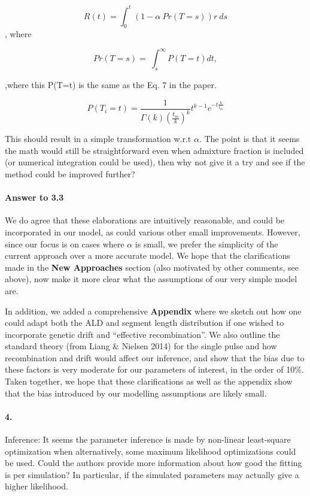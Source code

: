 \documentclass[11pt]{article}
\let\oldparagraph\paragraph
\renewcommand{\paragraph}[1]{\oldparagraph{#1}\mbox{}}
\begin{document}
$$R(t) = \int_{0}^{t}{\left(1-\alpha\ Pr(T=s)\right)r\ ds}$$,
 where 

$$Pr\left(T=s\right)=\ \int_{s}^{\infty}P\left(T=t\right)dt,$$

,where this P(T=t) is the same as the Eq. 7 in the paper.
 
$$  P(T_i=t)=\frac{1}{\Gamma(k)(\frac{t_m}{k})^k}t^{k-1}e^{-t\frac{k}{t_m}}$$
 
This should result in a simple transformation w.r.t $\alpha$. The point is that it seems the math would still be straightforward even when admixture fraction is included (or numerical integration could be used), then why not give it a try and see if the method could be improved further?

\paragraph{Answer to 3.3}
We do agree that these elaborations are intuitively reasonable, and could be incorporated in our model, as could various other small improvements. However, since our focus is on cases where $\alpha$ is small, we prefer the simplicity of the current approach over a more accurate model. We hope that the clarifications made in the \textbf{New Approaches} section (also motivated by other comments, see above), now make it more clear what the assumptions of our very simple model are.

In addition, we added a comprehensive \textbf{Appendix} where we sketch out how one could adapt both the ALD and segment length distribution if one wished to incorporate genetic drift and ``effective recombination''. We also outline the standard theory (from Liang \& Nielsen 2014) for the single pulse and how recombination and drift would affect our inference, and show that the bias due to these factors is very moderate for our parameters of interest, in the order of 10\%. Taken together, we hope that these clarifications as well as the appendix show that the bias introduced by our modelling assumptions are likely small.

\paragraph{4.}
Inference: It seems the parameter inference is made by non-linear least-square optimization when alternatively, some maximum likelihood optimizations could be used. Could the authors provide more information about how good the fitting is per simulation? In particular, if the simulated parameters may actually give a higher likelihood.
\end{document}
